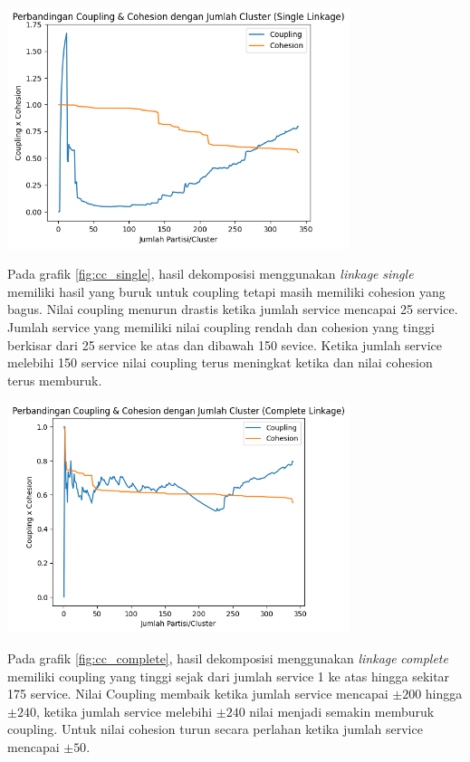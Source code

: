 \begin{center}
	\includegraphics[width=10cm]{img/bab_4/cc_single.png}
	\label{fig:cc_single}
\end{center}

 Pada grafik \ref{fig:cc_single}, hasil dekomposisi menggunakan \textit{linkage} \textit{single} memiliki hasil yang buruk untuk coupling tetapi masih memiliki cohesion yang bagus. Nilai coupling menurun drastis ketika jumlah service mencapai 25 service. Jumlah service yang memiliki nilai coupling rendah dan cohesion yang tinggi berkisar dari 25 service ke atas dan dibawah 150 sevice. Ketika jumlah service melebihi 150 service nilai coupling terus meningkat ketika dan nilai cohesion terus memburuk.
 
\begin{center}
	\includegraphics[width=10cm]{img/bab_4/cc_comp.png}
	\label{fig:cc_complete}
\end{center}

Pada grafik \ref{fig:cc_complete}, hasil dekomposisi menggunakan \textit{linkage} \textit{complete} memiliki coupling yang tinggi sejak dari jumlah service 1 ke atas hingga sekitar 175 service. Nilai Coupling membaik ketika jumlah service mencapai   $\pm 200$  hingga  $\pm 240$, ketika jumlah service melebihi  $\pm 240$ nilai menjadi semakin memburuk coupling. Untuk nilai cohesion turun secara perlahan ketika jumlah service mencapai  $\pm 50$.

